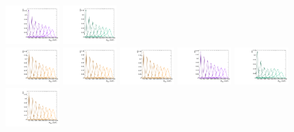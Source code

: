 \begin{figure}[htbp]
  \includegraphics[width=0.18\textwidth]{fig/2Dfit/templateSignalVsMX_fromDC_WprToWZ_MVV_mu_LP_bb_LDy.pdf}
  \includegraphics[width=0.18\textwidth]{fig/2Dfit/templateSignalVsMX_fromDC_WprToWH_MVV_mu_LP_bb_LDy.pdf}\\
  \includegraphics[width=0.18\textwidth]{fig/2Dfit/templateSignalVsMX_fromDC_GbuToWW_MVV_mu_HP_nobb_LDy.pdf}
  \includegraphics[width=0.18\textwidth]{fig/2Dfit/templateSignalVsMX_fromDC_RadToWW_MVV_mu_HP_nobb_LDy.pdf}
  \includegraphics[width=0.18\textwidth]{fig/2Dfit/templateSignalVsMX_fromDC_ZprToWW_MVV_mu_HP_nobb_LDy.pdf}
  \includegraphics[width=0.18\textwidth]{fig/2Dfit/templateSignalVsMX_fromDC_WprToWZ_MVV_mu_HP_nobb_LDy.pdf}
  \includegraphics[width=0.18\textwidth]{fig/2Dfit/templateSignalVsMX_fromDC_WprToWH_MVV_mu_HP_nobb_LDy.pdf}\\
  \includegraphics[width=0.18\textwidth]{fig/2Dfit/templateSignalVsMX_fromDC_GbuToWW_MVV_mu_LP_nobb_LDy.pdf}

\end{figure}
